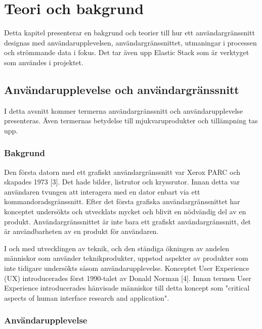 \documentclass{kththesis}
\begin{document}
\chapter{Teori och bakgrund}

Detta kapitel presenterar en bakgrund och teorier till hur ett användargränssnitt designas med användarupplevelsen, användargränssnittet, utmaningar i processen och strömmande data i fokus. Det tar även upp Elastic Stack som är verktyget som användes i projektet.

\section{Användarupplevelse och användargränssnitt} 
I detta avsnitt kommer termerna användargränssnitt och användarupplevelse presenteras. Även termernas betydelse till mjukvaruprodukter och tillämpning tas upp.

\subsection{Bakgrund} 

Den första datorn med ett grafiskt användargränssnitt var Xerox PARC och skapades 1973 [3]. Det hade bilder, listrutor och kryssrutor. Innan detta var användaren tvungen att interagera med en dator enbart via ett kommandoradsgränssnitt. Efter det första grafiska användargränssnittet har konceptet undersökts och utvecklats mycket och blivit en nödvändig del av en produkt. Användargränssnittet är inte bara ett grafiskt användargränssnitt, det är användbarheten av en produkt för användaren.

I och med utvecklingen av teknik, och den ständiga ökningen av andelen människor som använder teknikprodukter, uppstod aspekter av produkter som inte tidigare undersökts såsom användarupplevelse. Konceptet User Experience (UX) introducerades först 1990-talet av Donald Norman [4]. Innan termen User Experience introducerades hänvisade människor till detta koncept som "critical aspects of human interface research and application".

\subsection{Användarupplevelse}
 
\end{document}

